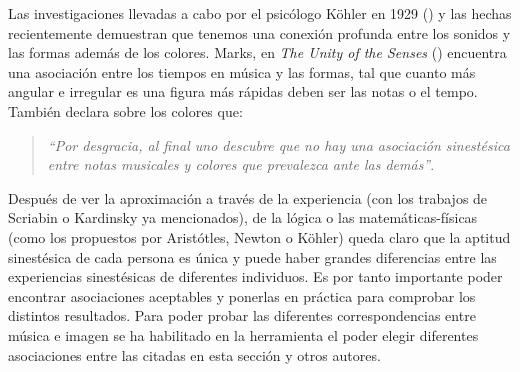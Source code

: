 Las investigaciones llevadas a cabo por el psicólogo Köhler en 1929 (\cite{GestaltPsychology}) y las hechas recientemente demuestran que tenemos una conexión profunda entre los sonidos y las formas además de los colores. Marks, en \emph{The Unity of the Senses} (\cite{TheUnityOfTheSenses}) encuentra una asociación entre los tiempos en música y las formas, tal que cuanto más angular e irregular es una figura \color{blue} más rápidas deben ser las notas o el tempo. \color{black} También declara sobre los colores que:
\begin{quote}
\emph{``Por desgracia, al final uno descubre que no hay una asociación sinestésica entre notas musicales y colores que prevalezca ante las demás''}.\\
\end{quote}

\color{blue} 
Después de ver la aproximación a través de la experiencia (con los trabajos de Scriabin o Kardinsky ya mencionados), de la lógica o las matemáticas-físicas (como los propuestos por Aristótles, Newton o Köhler) queda claro que la aptitud sinestésica de cada persona es única y puede haber grandes diferencias entre las experiencias sinestésicas de diferentes individuos. Es por tanto importante poder encontrar asociaciones aceptables y ponerlas en práctica para comprobar los distintos resultados. Para poder probar las diferentes correspondencias entre música e imagen se ha habilitado en la herramienta el poder elegir diferentes asociaciones entre las citadas en esta sección y otros autores. \color{black}